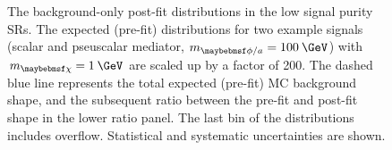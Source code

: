 \begin{figure}
  \caption{The background-only post-fit \ptmiss distributions in the low signal purity SRs. The expected (pre-fit) \ptmiss distributions for two example signals (scalar and pseuscalar mediator, $m_{\phi/a}=100\:\GeV$) with $\mDM=1\:\GeV$ are scaled up by a factor of 200. The dashed blue line represents the total expected (pre-fit) MC background \ptmiss shape, and the subsequent ratio between the pre-fit and post-fit shape in the lower ratio panel. The last bin of the distributions includes overflow. Statistical and systematic uncertainties are shown.}
  \label{fig:postfit_lo}
\end{figure}


